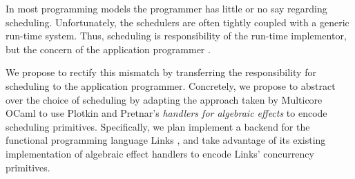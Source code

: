 \documentclass[preprint,10pt,numbers]{sigplanconf}
\begin{document}
In most programming models the programmer has little or no say regarding scheduling. Unfortunately, the schedulers are often tightly coupled with a generic run-time system. Thus, scheduling is responsibility of the run-time implementor, but the concern of the application programmer \cite{Dolan2015}. 

We propose to rectify this mismatch by transferring the responsibility for scheduling to the application programmer. Concretely, we propose to abstract over the choice of scheduling by adapting the approach taken by Multicore OCaml \cite{Dolan2015} to use Plotkin and Pretnar's \emph{handlers for algebraic effects} \cite{Plotkin2013} to encode scheduling primitives. Specifically, we plan implement a backend for the functional programming language Links \cite{Cooper2006}, and take advantage of its existing implementation of algebraic effect handlers \cite{Hillerstrom2015} to encode Links' concurrency primitives.


\end{document}
